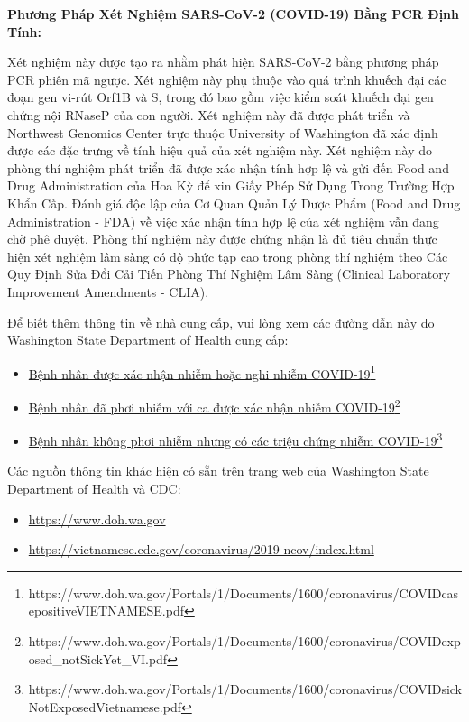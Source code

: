 \documentclass[10pt]{article}
\newcommand{\link}[2]{\href{#1}{#2}\footnote{#1}}
\begin{document}
\bigskip
\textbf{Phương Pháp Xét Nghiệm SARS-CoV-2 (COVID-19) Bằng PCR Định Tính:}

Xét nghiệm này được tạo ra nhằm phát hiện SARS-CoV-2 bằng phương pháp PCR phiên
mã ngược. Xét nghiệm này phụ thuộc vào quá trình khuếch đại các đoạn gen vi-rút
Orf1B và S, trong đó bao gồm việc kiểm soát khuếch đại gen chứng nội RNaseP của
con người. Xét nghiệm này đã được phát triển và Northwest Genomics Center trực
thuộc University of Washington đã xác định được các đặc trưng về tính hiệu quả
của xét nghiệm này. Xét nghiệm này do phòng thí nghiệm phát triển đã được xác
nhận tính hợp lệ và gửi đến Food and Drug Administration của Hoa Kỳ để xin Giấy
Phép Sử Dụng Trong Trường Hợp Khẩn Cấp. Đánh giá độc lập của Cơ Quan Quản Lý
Dược Phẩm (Food and Drug Administration - FDA) về việc xác nhận tính hợp lệ của
xét nghiệm vẫn đang chờ phê duyệt. Phòng thí nghiệm này được chứng nhận là đủ
tiêu chuẩn thực hiện xét nghiệm lâm sàng có độ phức tạp cao trong phòng thí
nghiệm theo Các Quy Định Sửa Đổi Cải Tiến Phòng Thí Nghiệm Lâm Sàng (Clinical
Laboratory Improvement Amendments - CLIA).

Để biết thêm thông tin về nhà cung cấp, vui lòng xem các đường dẫn này do
Washington State Department of Health cung cấp:

\begin{itemize}
\item

  \link{https://www.doh.wa.gov/Portals/1/Documents/1600/coronavirus/COVIDcasepositiveVIETNAMESE.pdf}{Bệnh
  nhân được xác nhận nhiễm hoặc nghi nhiễm COVID-19}

\item

  \link{https://www.doh.wa.gov/Portals/1/Documents/1600/coronavirus/COVIDexposed\_notSickYet\_VI.pdf}{Bệnh
  nhân đã phơi nhiễm với ca được xác nhận nhiễm COVID-19}

\item

  \link{https://www.doh.wa.gov/Portals/1/Documents/1600/coronavirus/COVIDsickNotExposedVietnamese.pdf}{Bệnh
  nhân không phơi nhiễm nhưng có các triệu chứng nhiễm COVID-19}

\end{itemize}

Các nguồn thông tin khác hiện có sẵn trên trang web của Washington State
Department of Health và CDC:

\begin{itemize}
\item

  \url{https://www.doh.wa.gov}

\item

  \url{https://vietnamese.cdc.gov/coronavirus/2019-ncov/index.html}

\end{itemize}
\end{document}
